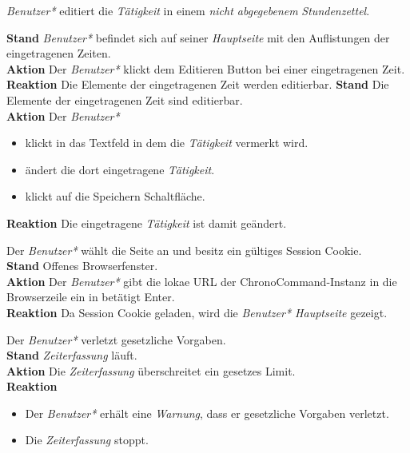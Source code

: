 \begin{requirements}
	 \emph{Benutzer*} editiert die \emph{Tätigkeit} in einem \emph{nicht abgegebenem} \emph{Stundenzettel}.
	\begin{requirements}
	        \textbf{Stand} \emph{Benutzer*} befindet sich auf seiner \emph{Hauptseite} mit den Auflistungen der eingetragenen Zeiten. \\
	        \textbf{Aktion} Der \emph{Benutzer*} klickt dem Editieren Button bei einer eingetragenen Zeit.\\
            \textbf{Reaktion} Die Elemente der eingetragenen Zeit werden editierbar.
        \textbf{Stand} Die Elemente der eingetragenen Zeit sind editierbar. \\
        \textbf{Aktion} Der \emph{Benutzer*}
            \begin{itemize}
                \item klickt in das Textfeld in dem die \emph{Tätigkeit} vermerkt wird.
                \item ändert die dort eingetragene \emph{Tätigkeit}.
                \item klickt auf die Speichern Schaltfläche.
            \end{itemize}
            \textbf{Reaktion} Die eingetragene \emph{Tätigkeit} ist damit geändert.
    \end{requirements}

     Der \emph{Benutzer*} wählt die Seite an und besitz ein gültiges Session Cookie. \\
        \textbf{Stand} Offenes Browserfenster. \\
        \textbf{Aktion} Der \emph{Benutzer*} gibt die lokae URL der ChronoCommand-Instanz in die Browserzeile ein in betätigt Enter. \\
        \textbf{Reaktion} Da Session Cookie geladen, wird die \emph{Benutzer* Hauptseite} gezeigt.

     Der \emph{Benutzer*} verletzt gesetzliche Vorgaben. \\
        \textbf{Stand} \emph{Zeiterfassung} läuft. \\
        \textbf{Aktion} Die \emph{Zeiterfassung} überschreitet ein gesetzes Limit. \\
        \textbf{Reaktion}
            \begin{itemize}
                \item Der \emph{Benutzer*} erhält eine \emph{Warnung}, dass er gesetzliche Vorgaben verletzt.
                \item Die \emph{Zeiterfassung} stoppt.
            \end{itemize}


\end{requirements}
